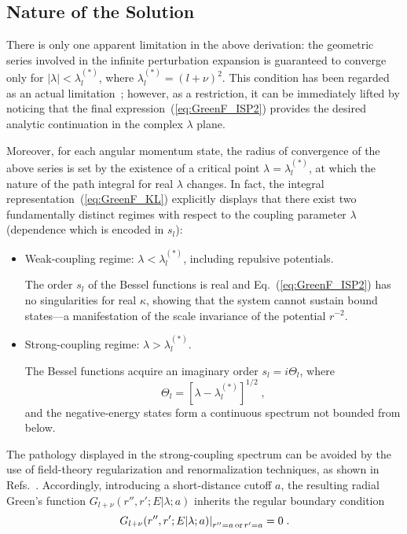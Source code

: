 \documentclass[a4paper,preprint,draft,showpacs,amsmath,amsfonts,amssymb,aps,prd]{revtex4}%
\begin{document}
\subsection{Nature of the Solution}
\label{sec:nature_of_solution}


There is only one apparent limitation in the above derivation:
the geometric series involved in the infinite perturbation 
expansion is guaranteed to converge only
for $|\lambda| < \lambda_{l}^{(\ast)} $, where 
$\lambda_{l}^{(\ast)} =(l+\nu)^{2}$. 
This condition
has been regarded as an actual limitation~\cite{bha:89};
however, as a restriction, it can be 
immediately lifted by noticing that the final 
expression~(\ref{eq:GreenF_ISP2}) 
provides the desired analytic continuation in the complex $\lambda$ plane.

Moreover, for each angular momentum state,
the radius of convergence of the above series is set by the 
existence of a critical point 
$\lambda = \lambda_{l}^{(\ast)} $, at which the
nature of the path integral for real $\lambda$ changes.
In fact, the integral representation~(\ref{eq:GreenF_KL})
explicitly displays that there exist two fundamentally distinct regimes
with respect to the coupling parameter $\lambda$ (dependence which
is encoded in $s_{l}$):
\begin{itemize}
\item
{\sf 
Weak-coupling regime\/}:
$ \lambda <\lambda_{l}^{(\ast)}$, including repulsive potentials.

The order $s_{l}$ of the Bessel functions  is real
and Eq.~(\ref{eq:GreenF_ISP2}) has no singularities for real $\kappa$, 
showing that
the system cannot sustain bound states---a manifestation of 
the scale invariance of the potential $r^{-2}$.

\item
{\sf 
Strong-coupling regime\/}:
$ \lambda >\lambda_{l}^{(\ast)} $.

The Bessel functions acquire an imaginary order $s_{l}=i \Theta_{l}$,
where 
\begin{equation}
\Theta_{l} 
= [ \lambda - \lambda_{l}^{(\ast)} ]^{1/2}
\;  ,
\label{eq:theta_coupling}
\end{equation}
 and the negative-energy states form a
continuous spectrum not bounded from below. 
\end{itemize}

 The pathology displayed in the strong-coupling
spectrum can be avoided by the use of field-theory
regularization and renormalization techniques,
as shown in Refs.~\cite{gup:93,cam:00,cam:01}.
Accordingly, introducing a short-distance cutoff
$a$, 
the resulting radial Green's function
$ G_{l+\nu} (r'',r';E|\lambda;a)$
inherits the
regular boundary condition 
\begin{equation}
\left. G_{l+\nu} (r'',r';E|\lambda;a)
\right|_{r''=a \, {\rm or } \, r'=a}  
=0
\;  .
\label{eq:regularized_BC}
\end{equation} 
\end{document}
